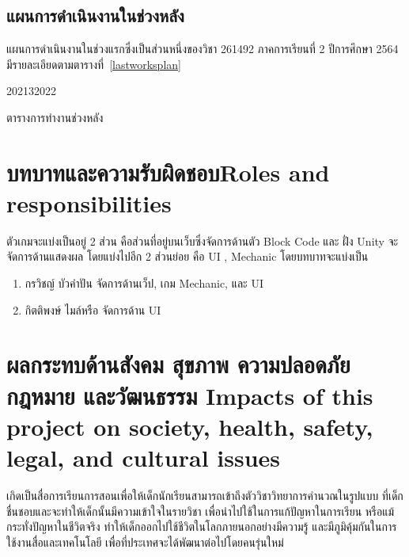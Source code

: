 \subsection{แผนการดำเนินงานในช่วงหลัง}
แผนการดำเนินงานในช่วงแรกซึ่งเป็นส่วนหนึ่งของวิชา 261492 ภาคการเรียนที่ 2 ปีการศึกษา 2564 มีรายละเอียดตามตารางที่~\ref{lastworksplan}
\begin{table}
    \begin{plan}{10}{2021}{3}{2022}
    \end{plan}
    \caption[ตารางการทำงานช่วงหลัง]{ตารางการทำงานช่วงหลัง}
    \label{lastworksplan}
\end{table}

\section{\ifcpe บทบาทและความรับผิดชอบ\else Roles and responsibilities\fi}
ตัวเกมจะแบ่งเป็นอยู่ 2 ส่วน คือส่วนที่อยู่บนเว็บซึ่งจัดการด้านตัว Block Code และ ฝั่ง Unity จะจัดการด้านแสดงผล โดยแบ่งไปอีก
2 ส่วนย่อย คือ UI , Mechanic โดยบทบาทจะแบ่งเป็น
\begin{enumerate}
    \item กรวิชญ์ บัวคำปัน จัดการด้านเว็ป, เกม Mechanic, และ UI
    \item กิตติพงษ์ ไมล์หรือ จัดการด้าน UI
\end{enumerate}

\section{\ifcpe%
ผลกระทบด้านสังคม สุขภาพ ความปลอดภัย กฎหมาย และวัฒนธรรม
\else%
Impacts of this project on society, health, safety, legal, and cultural issues
\fi}

เกิดเป็นสื่อการเรียนการสอนเพื่อให้เด็กนักเรียนสามารถเข้าถึงตัววิชาวิทยาการคำนวณในรูปแบบ \newline ที่เด็กชื่นชอบและจะทำให้เด็กนั้นมีความเข้าใจในรายวิชา เพื่อนำไปใช้ในการแก้ปัญหาในการเรียน หรือแม้กระทั่งปัญหาในชีวิตจริง ทำให้เด็กออกไปใช้ชีวิตในโลกภายนอกอย่างมีความรู้ และมีภูมิคุ้มกันในการใช้งานสื่อและเทคโนโลยี เพื่อที่ประเทศจะได้พัฒนาต่อไปโดยคนรุ่นใหม่
